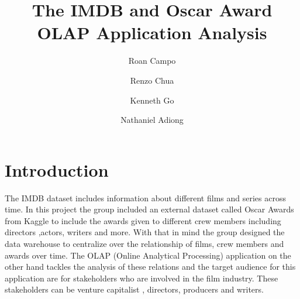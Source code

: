 \documentclass[sigconf, pbalance]{acmart}
\begin{document}
\title{The IMDB and Oscar Award OLAP Application Analysis}


\author{Roan Campo}

\author{Renzo Chua}

\author{Kenneth Go}

\author{Nathaniel Adiong}

\renewcommand{\shortauthors}{Trovato et al.}


\maketitle

\section{Introduction}

The IMDB dataset includes information about different films and series across time. In this project the group included an external dataset called Oscar Awards from Kaggle \cite{FontesLu} to include the awards given to different crew members including directors ,actors, writers and more.  With that in mind the group designed the data warehouse to centralize over the relationship of films, crew members and awards over time. The OLAP  (Online Analytical Processing) application on the other hand tackles the analysis of these relations and the target audience for this application are for stakeholders who are involved in the film industry. These stakeholders can be venture capitalist \cite{investopedia2025vc}, directors, producers and writers.
\end{document}
